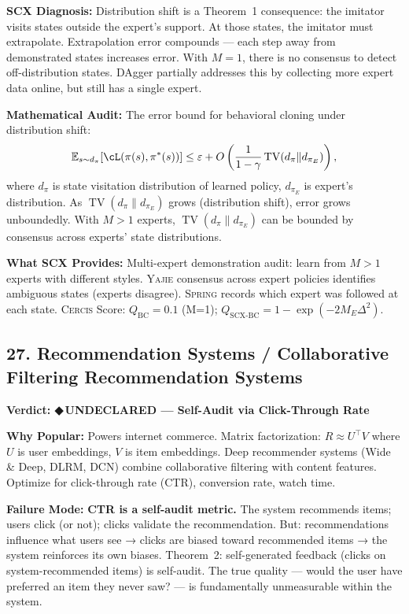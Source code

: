 \documentclass[12pt,a4paper]{article}
\theoremstyle{definition}
\newcommand{\guilty}{{\color{guiltycolor}\textbf{◆\,UNDECLARED}}}
\newcommand{\Yajie}{\textsc{Yajie}}
\newcommand{\Spring}{\textsc{Spring}}
\newcommand{\Cercis}{\textsc{Cercis}}
\DeclareMathOperator{\TV}{TV}
\newcommand{\E}{\mathbb{E}}
\newcommand{\auditHeader}[1]{\medskip\noindent\textbf{\large #1}\medskip}
\newcommand{\whyPopular}{\noindent\textbf{Why Popular:} }
\newcommand{\whyFail}{\noindent\textbf{Failure Mode:} }
\newcommand{\whatMissing}{\noindent\textbf{What SCX Provides:} }
\newcommand{\diagnosis}{\noindent\textbf{SCX Diagnosis:} }
\newcommand{\mathAudit}{\noindent\textbf{Mathematical Audit:} }
\begin{document}
\diagnosis{} Distribution shift is a Theorem~1 consequence: the imitator visits states outside the expert's support. At those states, the imitator must extrapolate. Extrapolation error compounds — each step away from demonstrated states increases error. With $M=1$, there is no consensus to detect off-distribution states. DAgger partially addresses this by collecting more expert data online, but still has a single expert.

\mathAudit{} The error bound for behavioral cloning under distribution shift:
\[
\E_{s \sim d_\pi}[\cL(\pi(s), \pi^*(s))] \le \varepsilon + O\left(\frac{1}{1-\gamma}\TV(d_\pi \| d_{\pi_E})\right),
\]
where $d_\pi$ is state visitation distribution of learned policy, $d_{\pi_E}$ is expert's distribution. As $\TV(d_\pi \| d_{\pi_E})$ grows (distribution shift), error grows unboundedly. With $M>1$ experts, $\TV(d_\pi \| d_{\pi_E})$ can be bounded by consensus across experts' state distributions.

\whatMissing{} Multi-expert demonstration audit: learn from $M>1$ experts with different styles. \Yajie{} consensus across expert policies identifies ambiguous states (experts disagree). \Spring{} records which expert was followed at each state. \Cercis{} Score: $Q_{\text{BC}} = 0.1$ (M=1); $Q_{\text{SCX-BC}} = 1 - \exp(-2M_E\Delta^2)$.

\subsection{27. Recommendation Systems / Collaborative Filtering Recommendation Systems}

\auditHeader{Verdict: \guilty{} — Self-Audit via Click-Through Rate}

\whyPopular{} Powers internet commerce. Matrix factorization: $R \approx U^\top V$ where $U$ is user embeddings, $V$ is item embeddings. Deep recommender systems (Wide \& Deep, DLRM, DCN) combine collaborative filtering with content features. Optimize for click-through rate (CTR), conversion rate, watch time.

\whyFail{} \textbf{CTR is a self-audit metric.} The system recommends items; users click (or not); clicks validate the recommendation. But: recommendations influence what users see → clicks are biased toward recommended items → the system reinforces its own biases. Theorem~2: self-generated feedback (clicks on system-recommended items) is self-audit. The true quality — would the user have preferred an item they never saw? — is fundamentally unmeasurable within the system.
\end{document}
